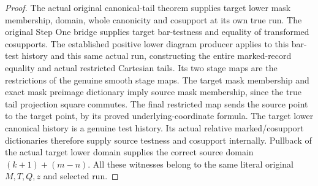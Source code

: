 \begin{proof}
The actual original canonical-tail theorem supplies target lower mask
membership, domain, whole canonicity and cosupport at its own true run.
The original Step One bridge supplies target bar-testness and equality
of transformed cosupports.  The established positive lower diagram
producer applies to this bar-test history and this same actual run,
constructing the entire marked-record equality and actual restricted
Cartesian tails.  Its two stage maps are the restrictions of the
genuine smooth stage maps.  The target mask membership and exact mask
preimage dictionary imply source mask membership, since the true tail
projection square commutes.  The final restricted map sends the source
point to the target point, by its proved underlying-coordinate formula.
The target lower canonical history is a genuine test history.  Its
actual relative marked/cosupport dictionaries therefore supply source
testness and cosupport internally.  Pullback of the actual target lower
domain supplies the correct source domain $(k+1)+(m-n)$.  All these
witnesses belong to the same literal original $M,T,Q,z$ and selected run.
\end{proof}

